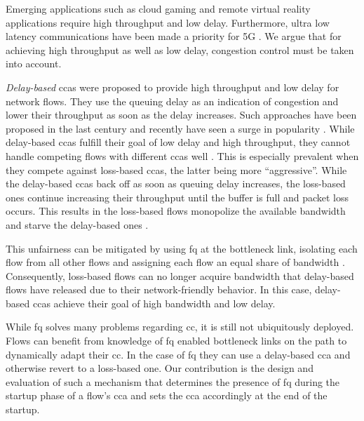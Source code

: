 \documentclass[conference]{IEEEtran}
\begin{document}
Emerging applications such as cloud gaming \cite{jarschel_evaluation_2011} and remote virtual reality \cite{elbamby_toward_2018} applications require high throughput and low delay. Furthermore, ultra low latency communications have been made a priority for 5G \cite{li_5g_2018}. We argue that for achieving high throughput as well as low delay, congestion control must be taken into account. 

\textit{Delay-based} \glspl{cca} were proposed to provide high throughput and low delay for network flows. They use the queuing delay as an indication of congestion and lower their throughput as soon as the delay increases. Such approaches have been proposed in the last century \cite{brakmo_tcp_1995} and recently have seen a surge in popularity \cite{arun_copa_2018,hock_tcp_2017,mittal_timely_2015,cardwell_bbr:_2016}. While delay-based \glspl{cca} fulfill their goal of low delay and high throughput, they cannot handle competing flows with different \glspl{cca} well \cite{turkovic_fifty_2019, turkovic_interactions_2019}. This is especially prevalent when they compete against loss-based \glspl{cca}, the latter being more ``aggressive''. While the delay-based \glspl{cca} back off as soon as queuing delay increases, the loss-based ones continue increasing their throughput until the buffer is full and packet loss occurs. This results in the loss-based flows monopolize the available bandwidth and starve the delay-based ones \cite{hock_toward_2016,yuan-cheng_lai_improving_2001,awdeh_comparing_2004}.

This unfairness can be mitigated by using \gls{fq} at the bottleneck link, isolating each flow from all other flows and assigning each flow an equal share of bandwidth \cite{dumazet_pkt_sched:_2013}. Consequently, loss-based flows can no longer acquire bandwidth that delay-based flows have released due to their network-friendly behavior. In this case, delay-based \glspl{cca} achieve their goal of high bandwidth and low delay. 

While \gls{fq} solves many problems regarding \gls{cc}, it is still not ubiquitously deployed. Flows can benefit from knowledge of \gls{fq} enabled bottleneck links on the path to dynamically adapt their \gls{cc}. In the case of \gls{fq} they can use a delay-based \gls{cca} and otherwise revert to a loss-based one. Our contribution is the design and evaluation of such a mechanism that determines the presence of \gls{fq} during the startup phase of a flow's \gls{cca} and sets the \gls{cca} accordingly at the end of the startup. 
\end{document}
